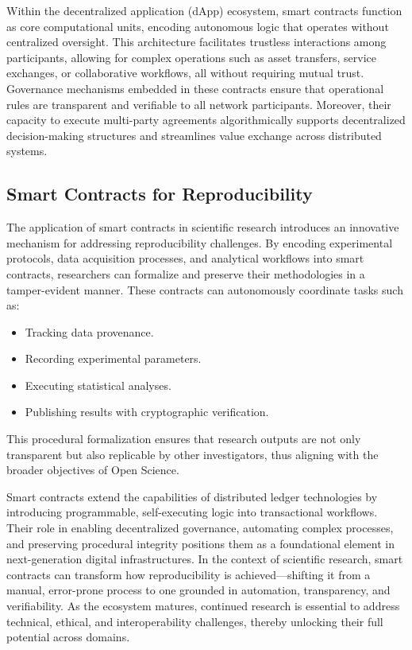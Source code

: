 \documentclass[final]{rc-book-2.14}
\begin{document}
Within the decentralized application (dApp) ecosystem, smart contracts function as core computational units, encoding autonomous logic that operates without centralized oversight. This architecture facilitates trustless interactions among participants, allowing for complex operations such as asset transfers, service exchanges, or collaborative workflows, all without requiring mutual trust. Governance mechanisms embedded in these contracts ensure that operational rules are transparent and verifiable to all network participants. Moreover, their capacity to execute multi-party agreements algorithmically supports decentralized decision-making structures and streamlines value exchange across distributed systems\cite{alharby2017blockchain}.

\subsection{Smart Contracts for Reproducibility}

The application of smart contracts in scientific research introduces an innovative mechanism for addressing reproducibility challenges. By encoding experimental protocols, data acquisition processes, and analytical workflows into smart contracts, researchers can formalize and preserve their methodologies in a tamper-evident manner\cite{pilehchiha2022improving}. These contracts can autonomously coordinate tasks such as:

\begin{itemize}
    \item Tracking data provenance.
    \item Recording experimental parameters.
    \item Executing statistical analyses.
    \item Publishing results with cryptographic verification.
\end{itemize}

This procedural formalization ensures that research outputs are not only transparent but also replicable by other investigators, thus aligning with the broader objectives of Open Science.

Smart contracts extend the capabilities of distributed ledger technologies by introducing programmable, self-executing logic into transactional workflows. Their role in enabling decentralized governance, automating complex processes, and preserving procedural integrity positions them as a foundational element in next-generation digital infrastructures. In the context of scientific research, smart contracts can transform how reproducibility is achieved—shifting it from a manual, error-prone process to one grounded in automation, transparency, and verifiability. As the ecosystem matures, continued research is essential to address technical, ethical, and interoperability challenges, thereby unlocking their full potential across domains.
\end{document}
